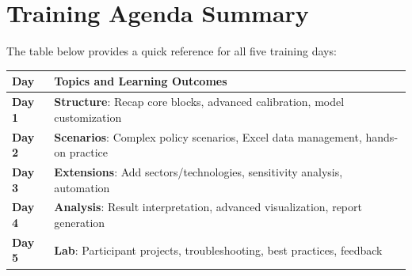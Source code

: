 \documentclass[11pt]{article}
\begin{document}
\section*{Training Agenda Summary}

The table below provides a quick reference for all five training days:

\vspace{1cm}
\begin{center}
\small
\begin{tabular}{|p{2cm}|p{12cm}|}
    \hline
    \textbf{Day} & \textbf{Topics and Learning Outcomes} \\
    \hline
    \hline
    \textbf{Day 1} & \textbf{Structure}: Recap core blocks, advanced calibration, model customization \\
    \hline
    \textbf{Day 2} & \textbf{Scenarios}: Complex policy scenarios, Excel data management, hands-on practice \\
    \hline
    \textbf{Day 3} & \textbf{Extensions}: Add sectors/technologies, sensitivity analysis, automation \\
    \hline
    \textbf{Day 4} & \textbf{Analysis}: Result interpretation, advanced visualization, report generation \\
    \hline
    \textbf{Day 5} & \textbf{Lab}: Participant projects, troubleshooting, best practices, feedback \\
    \hline
\end{tabular}
\end{center}
\end{document}
